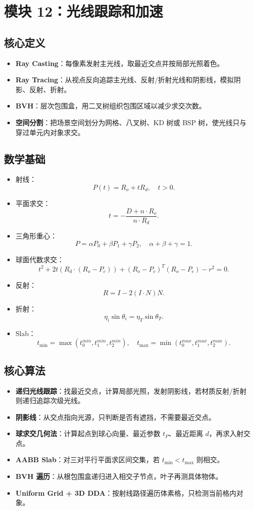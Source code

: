 \documentclass[UTF8,zihao=-4,scheme=chinese,fontset=fandol]{ctexart}
\newcommand{\key}[1]{\textbf{#1}}
\begin{document}
\section{模块 12：光线跟踪和加速}

\subsection{核心定义}
\begin{itemize}
  \item \key{Ray Casting}：每像素发射主光线，取最近交点并按局部光照着色。
  \item \key{Ray Tracing}：从视点反向追踪主光线、反射/折射光线和阴影线，模拟阴影、反射、折射。
  \item \key{BVH}：层次包围盒，用二叉树组织包围区域以减少求交次数。
  \item \key{空间分割}：把场景空间划分为网格、八叉树、KD 树或 BSP 树，使光线只与穿过单元内对象求交。
\end{itemize}

\subsection{数学基础}
\begin{itemize}
  \item 射线：
  \[
  P(t)=R_o+tR_d,\quad t>0.
  \]
  \item 平面求交：
  \[
  t=-\frac{D+n\cdot R_o}{n\cdot R_d}.
  \]
  \item 三角形重心：
  \[
  P=\alpha P_0+\beta P_1+\gamma P_2,\quad \alpha+\beta+\gamma=1.
  \]
  \item 球面代数求交：
  \[
  t^2+2t(R_d\cdot(R_o-P_c))+(R_o-P_c)^T(R_o-P_c)-r^2=0.
  \]
  \item 反射：
  \[
  R=I-2(I\cdot N)N.
  \]
  \item 折射：
  \[
  \eta_i\sin\theta_i=\eta_T\sin\theta_T.
  \]
  \item Slab：
  \[
  t_{\min}=\max(t_0^{min},t_1^{min},t_2^{min}),\quad
  t_{\max}=\min(t_0^{max},t_1^{max},t_2^{max}).
  \]
\end{itemize}

\subsection{核心算法}
\begin{itemize}
  \item \key{递归光线跟踪}：找最近交点，计算局部光照，发射阴影线，若材质反射/折射则递归追踪次级光线。
  \item \key{阴影线}：从交点指向光源，只判断是否有遮挡，不需要最近交点。
  \item \key{球求交几何法}：计算起点到球心向量、最近参数 $t_P$、最近距离 $d$，再求入射交点。
  \item \key{AABB Slab}：对三对平行平面求区间交集，若 $t_{\min}<t_{\max}$ 则相交。
  \item \key{BVH 遍历}：从根包围盒递归进入相交子节点，叶子再测具体物体。
  \item \key{Uniform Grid + 3D DDA}：按射线路径遍历体素格，只检测当前格内对象。
\end{itemize}
\end{document}
